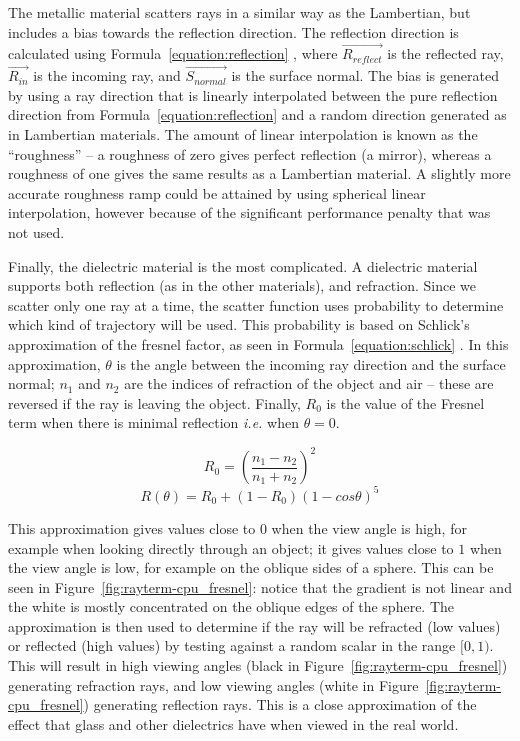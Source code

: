 The metallic material scatters rays in a similar way as the Lambertian, but includes a bias towards the reflection direction.
The reflection direction is calculated using Formula~\ref{equation:reflection} \cite{prunier2017shading}, where $\vec{R_{reflect}}$ is the reflected ray, $\vec{R_{in}}$ is the incoming ray, and $\vec{S_{normal}}$ is the surface normal.
The bias is generated by using a ray direction that is linearly interpolated between the pure reflection direction from Formula~\ref{equation:reflection} and a random direction generated as in Lambertian materials.
The amount of linear interpolation is known as the ``roughness'' -- a roughness of zero gives perfect reflection (a mirror), whereas a roughness of one gives the same results as a Lambertian material.
A slightly more accurate roughness ramp could be attained by using spherical linear interpolation, however because of the significant performance penalty that was not used.

Finally, the dielectric material is the most complicated.
A dielectric material supports both reflection (as in the other materials), and refraction.
Since we scatter only one ray at a time, the scatter function uses probability to determine which kind of trajectory will be used.
This probability is based on Schlick's approximation of the fresnel factor, as seen in Formula~\ref{equation:schlick} \cite{schlick1994inexpensive, learnopengltheory, prunier2017shading}.
In this approximation, $\theta$ is the angle between the incoming ray direction and the surface normal; $n_1$ and $n_2$ are the indices of refraction of the object and air -- these are reversed if the ray is leaving the object.
Finally, $R_0$ is the value of the Fresnel term when there is minimal reflection \textit{i.e.} when $\theta = 0$.

\begin{equation}
  \label{equation:schlick_base}
  R_0 = (\frac{n_1 - n_2}{n_1 + n_2})^2
\end{equation}
\begin{equation}
  \label{equation:schlick}
  R(\theta) = R_0 + (1 - R_0)(1 - cos \theta)^5
\end{equation}

This approximation gives values close to $0$ when the view angle is high, for example when looking directly through an object; it gives values close to $1$ when the view angle is low, for example on the oblique sides of a sphere.
This can be seen in Figure~\ref{fig:rayterm-cpu_fresnel}: notice that the gradient is not linear and the white is mostly concentrated on the oblique edges of the sphere.
The approximation is then used to determine if the ray will be refracted (low values) or reflected (high values) by testing against a random scalar in the range $[0, 1)$.
This will result in high viewing angles (black in Figure~\ref{fig:rayterm-cpu_fresnel}) generating refraction rays, and low viewing angles (white in Figure~\ref{fig:rayterm-cpu_fresnel}) generating reflection rays.
This is a close approximation of the effect that glass and other dielectrics have when viewed in the real world.

